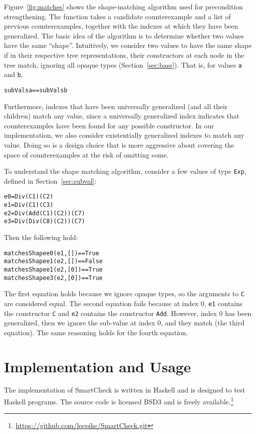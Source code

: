 \documentclass{sigplanconf}
\newenvironment{code}{\begin{alltt}\footnotesize}{\end{alltt}}
\newcommand{\ttp}[1]{\texttt{#1}}
\begin{document}
Figure~\ref{fig:matches} shows the shape-matching algorithm used for precondition
strengthening.  The function takes a candidate counterexample and a list of
previous counterexamples, together with the indexes at which they have been
generalized.  The basic idea of the algorithm is to determine whether two values
have the same ``shape''.  Intuitively, we consider two values to have the same
shape if in their respective tree representations, their constructors at each
node in the tree match, ignoring all opaque types (Section~\ref{sec:base}).
That is, for values \ttp{a} and \ttp{b},
%
\begin{code}
subVals a == subVals b
\end{code}
%
\noindent
Furthermore, indexes that have been universally generalized (and all their
children) match any value, since a universally generalized index indicates that
counterexamples have been found for any possible constructor.  In our
implementation, we also consider existentially generalized indexes to match any
value.  Doing so is a design choice that is more aggressive about covering the
space of counterexamples at the risk of omitting some.

To understand the shape matching algorithm, consider a few values of type
\ttp{Exp}, defined in Section~\ref{sec:subval}:
%
\begin{code}
e0 = Div (C 1) (C 2)
e1 = Div (C 1) (C 3)
e2 = Div (Add (C 1) (C 2)) (C 7)
e3 = Div (Div (C 8) (C 2)) (C 7)
\end{code}
%
\noindent
Then the following hold:
%
\begin{code}
matchesShape e0 (e1, [])  == True
matchesShape e1 (e2, [])  == False
matchesShape e1 (e2, [0]) == True
matchesShape e3 (e2, [0]) == True
\end{code}
%
The first equation holds because we ignore opaque types, so the arguments to
\ttp{C} are considered equal.  The second equation fails because at index 0,
\ttp{e1} contains the constructor \ttp{C} and \ttp{e2} contains the constructor
\ttp{Add}.  However, index 0 has been generalized, then we ignore the sub-value
at index 0, and they match (the third equation).  The same reasoning holds for
the fourth equation.


\section{Implementation and Usage}\label{sec:implementation}

The implementation of SmartCheck is written in Haskell and is designed to test
Haskell programs.  The source code is licensed BSD3 and is freely
available.\footnote{\url{https://github.com/leepike/SmartCheck.git}}
\end{document}
